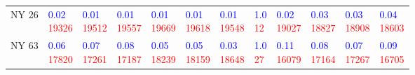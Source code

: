 \begin{tabular}{llllllllllll}
NY 26  &  \makecell{\textcolor{blue}{0.02} \\ \textcolor{red}{19326}} &  \makecell{\textcolor{blue}{0.01} \\ \textcolor{red}{19512}} &  \makecell{\textcolor{blue}{0.01} \\ \textcolor{red}{19557}} &  \makecell{\textcolor{blue}{0.01} \\ \textcolor{red}{19669}} &  \makecell{\textcolor{blue}{0.01} \\ \textcolor{red}{19618}} &  \makecell{\textcolor{blue}{0.01} \\ \textcolor{red}{19548}} &    \makecell{\textcolor{blue}{1.0} \\ \textcolor{red}{12}} &  \makecell{\textcolor{blue}{0.02} \\ \textcolor{red}{19027}} &  \makecell{\textcolor{blue}{0.03} \\ \textcolor{red}{18827}} &  \makecell{\textcolor{blue}{0.03} \\ \textcolor{red}{18908}} &  \makecell{\textcolor{blue}{0.04} \\ \textcolor{red}{18603}} \\
NY 63  &  \makecell{\textcolor{blue}{0.06} \\ \textcolor{red}{17820}} &  \makecell{\textcolor{blue}{0.07} \\ \textcolor{red}{17261}} &  \makecell{\textcolor{blue}{0.08} \\ \textcolor{red}{17187}} &  \makecell{\textcolor{blue}{0.05} \\ \textcolor{red}{18239}} &  \makecell{\textcolor{blue}{0.05} \\ \textcolor{red}{18159}} &  \makecell{\textcolor{blue}{0.03} \\ \textcolor{red}{18648}} &    \makecell{\textcolor{blue}{1.0} \\ \textcolor{red}{27}} &  \makecell{\textcolor{blue}{0.11} \\ \textcolor{red}{16079}} &  \makecell{\textcolor{blue}{0.08} \\ \textcolor{red}{17164}} &  \makecell{\textcolor{blue}{0.07} \\ \textcolor{red}{17267}} &  \makecell{\textcolor{blue}{0.09} \\ \textcolor{red}{16705}} \\

\end{tabular}
